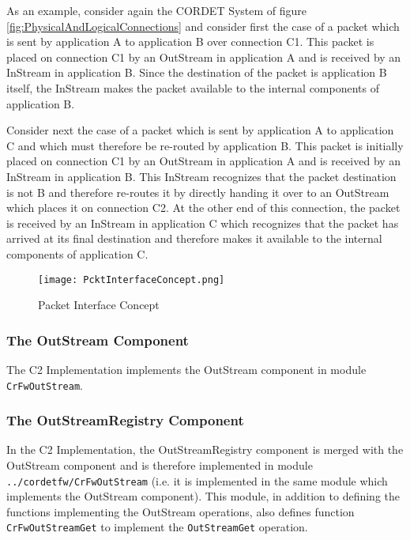 \documentclass{pnp_article}
\begin{document}
As an example, consider again the CORDET System of figure \ref{fig:PhysicalAndLogicalConnections} and consider first the case of a packet which is sent by application A to application B over connection C1. This packet is placed on connection C1 by an OutStream in application A and is received by an InStream in application B. Since the destination of the packet is application B itself, the InStream makes the packet available to the internal components of application B.

Consider next the case of a packet which is sent by application A to application C and which must therefore be re-routed by application B. This packet is initially placed on connection C1 by an OutStream in application A and is received by an InStream in application B. This InStream recognizes that the packet destination is not B and therefore re-routes it by directly handing it over to an OutStream which places it on connection C2. At the other end of this connection, the packet is received by an InStream in application C which recognizes that the packet has arrived at its final destination and therefore makes it available to the internal components of application C. 

\begin{figure}[ht]
 \centering
 \texttt{[image: PcktInterfaceConcept.png]}
 \caption{Packet Interface Concept}
 \label{fig:PcktInterfaceConcept}
\end{figure}


\subsubsection{The OutStream Component}\label{sec:OutStream}


The C2 Implementation implements the OutStream component in module \texttt{CrFwOutStream}. 


\subsubsection{The OutStreamRegistry Component}\label{sec:OutStreamRegistry}


In the C2 Implementation, the OutStreamRegistry component is merged with the OutStream component and is therefore implemented in module \texttt{../cordetfw/CrFwOutStream} (i.e. it is implemented in the same module which implements the OutStream component). This module, in addition to defining the functions implementing the OutStream operations, also defines function \texttt{CrFwOutStreamGet} to implement the \texttt{OutStreamGet} operation. 
\end{document}
